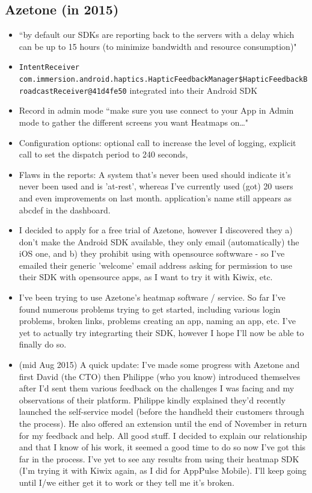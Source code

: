 \subsection{Azetone (in 2015)}
\begin{itemize}
    \item ``by default our SDKs are reporting back to the servers with a delay which can be up to 15 hours (to minimize bandwidth and resource consumption)"
    \item  \texttt{IntentReceiver com.immersion.android.haptics.HapticFeedbackManager\$HapticFeedbackBroadcastReceiver@41d4fe50} integrated into their Android SDK
    \item Record in admin mode ``make sure you use connect to your App in Admin mode to gather the different screens you want Heatmaps on…"
    \item Configuration options: optional call to increase the level of logging, explicit call to set the dispatch period to 240 seconds,
    \item Flaws in the reports: A system that's never been used should indicate it's never been used and is 'at-rest', whereas I've currently used (got) 20 users and even improvements on last month. application's name still appears as abcdef in the dashboard.
    \item  I decided to apply for a free trial of Azetone, however I discovered they a) don't make the Android SDK available, they only email (automatically) the iOS one, and b) they prohibit using with opensource softwware - so I've emailed their generic 'welcome' email address asking for permission to use their SDK with opensource apps, as I want to try it with Kiwix, etc.
    \item I've been trying to use Azetone's heatmap software / service. So far I've found numerous problems trying to get started, including various login problems, broken links, problems creating an app, naming an app, etc. I've yet to actually try integrarting their SDK, however I hope I'll now be able to finally do so.
    \item (mid Aug 2015) A quick update: I've made some progress with Azetone and first David (the CTO) then Philippe (who you know) introduced themselves after I'd sent them various feedback on the challenges I was facing and my observations of their platform. Philippe kindly explained they'd recently launched the self-service model (before the handheld their customers through the process). He also offered an extension until the end of November in return for my feedback and help. All good stuff. I decided to explain our relationship and that I know of his work, it seemed a good time to do so now I've got this far in the process. I've yet to see any results from using their heatmap SDK (I'm trying it with Kiwix again, as I did for AppPulse Mobile). I'll keep going until I/we either get it to work or they tell me it's broken.

\end{itemize}

